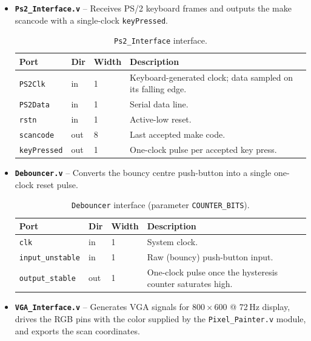\documentclass[11pt,a4paper]{article}
\begin{document}
\begin{itemize}
  \item \textbf{\texttt{Ps2\_Interface.v}} -- Receives PS/2 keyboard frames
    and outputs the make scancode with a single-clock \texttt{keyPressed}.

    \begin{table}[H]
      \centering\small
      \caption{\texttt{Ps2\_Interface} interface.}
      \begin{tabular}{lllp{}}
        \toprule
        \textbf{Port} & \textbf{Dir} & \textbf{Width} & \textbf{Description} \\
        \midrule
        \texttt{PS2Clk}  & in  & 1 & Keyboard-generated clock; data sampled
          on its falling edge. \\
        \texttt{PS2Data} & in  & 1 & Serial data line. \\
        \texttt{rstn}    & in  & 1 & Active-low reset. \\
        \texttt{scancode} & out & 8 & Last accepted make code. \\
        \texttt{keyPressed} & out & 1 & One-clock pulse per accepted key press. \\
        \bottomrule
      \end{tabular}
    \end{table}

  \item \textbf{\texttt{Debouncer.v}} -- Converts the bouncy centre
    push-button into a single one-clock reset pulse.

    \begin{table}[H]
      \centering\small
      \caption{\texttt{Debouncer} interface (parameter \texttt{COUNTER\_BITS}).}
      \begin{tabular}{lllp{}}
        \toprule
        \textbf{Port} & \textbf{Dir} & \textbf{Width} & \textbf{Description} \\
        \midrule
        \texttt{clk} & in & 1 & System clock. \\
        \texttt{input\_unstable} & in & 1 & Raw (bouncy) push-button input. \\
        \texttt{output\_stable} & out & 1 & One-clock pulse once the
          hysteresis counter saturates high. \\
        \bottomrule
      \end{tabular}
    \end{table}

  \item \textbf{\texttt{VGA\_Interface.v}} -- Generates VGA signals for
    $800\times600$ @ 72\,Hz display, drives the RGB pins with the color
    supplied by the \texttt{Pixel\_Painter.v} module, and exports the scan coordinates.


\end{itemize}
\end{document}
